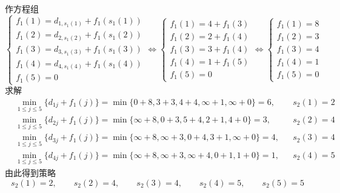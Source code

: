 \documentclass[lang = cn, scheme = chinese, thmcnt = section]{elegantbook}
\begin{document}
\begin{solution}
	作方程组
	$$
	\begin{cases}
		f_1(1)=d_{1,s_1(1)}+f_1(s_1(1))\\
		f_1(2)=d_{2,s_1(2)}+f_1(s_1(2))\\
		f_1(3)=d_{3,s_1(3)}+f_1(s_1(3))\\
		f_1(4)=d_{4,s_1(4)}+f_1(s_1(4))\\
		f_1(5)=0
	\end{cases}
	\iff
	\begin{cases}
		f_1(1)=4+f_1(3)\\
		f_1(2)=2+f_1(4)\\
		f_1(3)=3+f_1(4)\\
		f_1(4)=1+f_1(5)\\
		f_1(5)=0
	\end{cases}
	\iff
	\begin{cases}
		f_1(1)=8\\
		f_1(2)=3\\
		f_1(3)=4\\
		f_1(4)=1\\
		f_1(5)=0
	\end{cases}
	$$
	求解
	\begin{align*}
		& \min_{1\le  j \le 5}\{ d_{1j}+f_1(j) \}
		=\min\{ 0+8, 3+3, 4+4, \infty+1, \infty+0 \}
		=6,&&
		s_2(1)=2\\
		& \min_{1\le  j \le 5}\{ d_{2j}+f_1(j) \}
		=\min\{ \infty+8, 0+3, 5+4, 2+1, 4+0 \}
		=3,&&
		s_2(2)=4\\
		& \min_{1\le  j \le 5}\{ d_{3j}+f_1(j) \}
		=\min\{ \infty+8, \infty+3, 0+4, 3+1, \infty+0 \}
		=4,&&
		s_2(3)=4\\
		& \min_{1\le  j \le 5}\{ d_{4j}+f_1(j) \}
		=\min\{ \infty+8, \infty+3, \infty+4, 0+1, 1+0 \}
		=1,&&
		s_2(4)=5
	\end{align*}
	由此得到策略
	$$
	s_2(1)=2,\qquad
	s_2(2)=4,\qquad
	s_2(3)=4,\qquad
	s_2(4)=5,\qquad
	s_2(5)=5
	$$
	

\end{solution}
\end{document}
